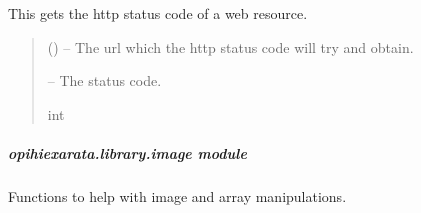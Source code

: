 \documentclass[letterpaper,11pt,english]{sphinxmanual}
\begin{document}
\begin{savenotes}\begin{fulllineitems}
\label{\detokenize{code/opihiexarata.library.http:opihiexarata.library.http.get_http_status_code}}
\pysigstartsignatures
{}
\pysigstopsignatures
\sphinxAtStartPar
This gets the http status code of a web resource.
\begin{quote}\begin{description}
\sphinxAtStartPar
{} () – The url which the http status code will try and obtain.

\sphinxAtStartPar
{} – The status code.

\sphinxAtStartPar
int

\end{description}\end{quote}

\end{fulllineitems}\end{savenotes}


\sphinxstepscope


\subparagraph{opihiexarata.library.image module}
\label{\detokenize{code/opihiexarata.library.image:module-opihiexarata.library.image}}\label{\detokenize{code/opihiexarata.library.image:opihiexarata-library-image-module}}\label{\detokenize{code/opihiexarata.library.image::doc}}
\sphinxAtStartPar
Functions to help with image and array manipulations.
\end{document}
